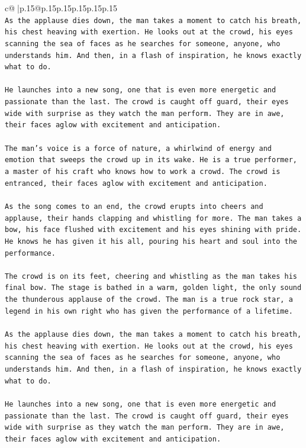 \documentclass{article}
\begin{document}
{\begin{supertabular}{c@{$\;$}|p{.15\linewidth}@{}p{.15\linewidth}p{.15\linewidth}p{.15\linewidth}p{.15\linewidth}p{.15\linewidth}}
{{{\\ 
\texttt{As the applause dies down, the man takes a moment to catch his breath, his chest heaving with exertion. He looks out at the crowd, his eyes scanning the sea of faces as he searches for someone, anyone, who understands him. And then, in a flash of inspiration, he knows exactly what to do.} \\
\\ 
\texttt{He launches into a new song, one that is even more energetic and passionate than the last. The crowd is caught off guard, their eyes wide with surprise as they watch the man perform. They are in awe, their faces aglow with excitement and anticipation.} \\
\\ 
\texttt{The man's voice is a force of nature, a whirlwind of energy and emotion that sweeps the crowd up in its wake. He is a true performer, a master of his craft who knows how to work a crowd. The crowd is entranced, their faces aglow with excitement and anticipation.} \\
\\ 
\texttt{As the song comes to an end, the crowd erupts into cheers and applause, their hands clapping and whistling for more. The man takes a bow, his face flushed with excitement and his eyes shining with pride. He knows he has given it his all, pouring his heart and soul into the performance.} \\
\\ 
\texttt{The crowd is on its feet, cheering and whistling as the man takes his final bow. The stage is bathed in a warm, golden light, the only sound the thunderous applause of the crowd. The man is a true rock star, a legend in his own right who has given the performance of a lifetime.} \\
\\ 
\texttt{As the applause dies down, the man takes a moment to catch his breath, his chest heaving with exertion. He looks out at the crowd, his eyes scanning the sea of faces as he searches for someone, anyone, who understands him. And then, in a flash of inspiration, he knows exactly what to do.} \\
\\ 
\texttt{He launches into a new song, one that is even more energetic and passionate than the last. The crowd is caught off guard, their eyes wide with surprise as they watch the man perform. They are in awe, their faces aglow with excitement and anticipation.} \\
\\ 
}}}
\end{supertabular}}
\end{document}
